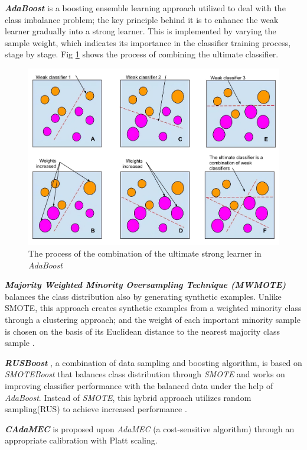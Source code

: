 \textbf{\textit{AdaBoost}} \cite{63} is a boosting ensemble learning approach utilized to deal with the class imbalance problem; the key principle behind it is to enhance the weak learner gradually into a strong learner. This is implemented by varying the sample weight, which indicates its importance in the classifier training process, stage by stage. Fig \ref{fig4} shows the process of combining the ultimate classifier.
\begin{figure}[h]
    \centering
    \includegraphics[width=\textwidth]{images/fig4}
    \caption{The process of the combination of the ultimate strong learner in \textit{AdaBoost}}
    \label{fig4}
\end{figure}

\textbf{\textit{Majority Weighted Minority Oversampling Technique (MWMOTE)}} \cite{62} balances the class distribution also by generating synthetic examples. Unlike SMOTE, this approach creates synthetic examples from a weighted minority class through a clustering approach; and the weight of each important minority sample is chosen on the basis of its Euclidean distance to the nearest majority class sample \cite{62}.

\textbf{\textit{RUSBoost}} \cite{64}, a combination of data sampling and boosting algorithm, is based on \textit{SMOTEBoost} \cite{68} that balances class distribution through \textit{SMOTE} and works on improving classifier performance with the balanced data under the help of \textit{AdaBoost}.  Instead of \textit{SMOTE}, this hybrid approach utilizes random sampling(RUS) to achieve increased performance \cite{64}.

\textbf{\textit{CAdaMEC}} \cite{67} is proposed upon \textit{AdaMEC} \cite{66}(a cost-sensitive algorithm) through an appropriate calibration with Platt scaling.

